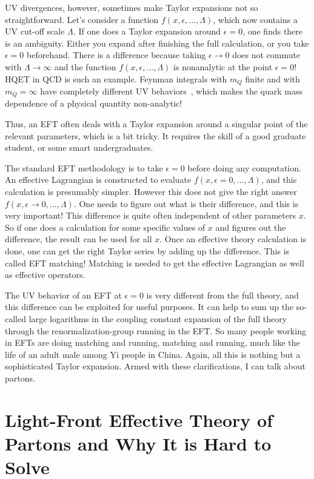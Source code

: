 \documentclass[prd,aps,twocolumn,preprintnumbers,showpacs,nofootinbib,superscriptaddress,notitlepage]{revtex4-1}
\begin{document}
UV divergences, however, sometimes make Taylor expansions
not so straightforward. Let's consider a function
$f(x,\epsilon,...,\Lambda)$, which now contains a UV
cut-off scale $\Lambda$. If one does
a Taylor expansion around $\epsilon=0$, one finds
there is an ambiguity. Either you expand after finishing
the full calculation, or you take $\epsilon=0$ beforehand.
There is a difference because taking $\epsilon \to 0$ does not commute
with $\Lambda\to \infty$ and the function  $f(x,\epsilon,...,\Lambda)$
is nonanalytic at the point $\epsilon=0$! HQET in QCD is such an example.
Feynman integrals with $m_Q$ finite and with
$m_Q=\infty$ have completely different
UV behaviors~\cite{Manohar:2000dt}, which makes the quark
mass dependence of a physical quantity non-analytic!

Thus, an EFT often deals with a Taylor expansion around
a singular point of the relevant parameters, which is a bit
tricky. It requires the skill of a good graduate
student, or some smart undergraduates.

The standard EFT methodology is to take $\epsilon=0$
before doing any computation. An effective Lagrangian
is constructed to evaluate $f(x,\epsilon=0,...,\Lambda)$, and this calculation
is presumably simpler. However
this does not give the right answer $f(x,\epsilon\to 0,...,\Lambda)$.
One needs to figure out what is their difference, and
this is very important! This difference is quite
often independent of other parameters $x$. So if one does
a calculation for some specific values of $x$
and figures out the difference, the result
can be used for all $x$. Once an effective
theory calculation is done, one can get
the right Taylor series by adding up the
difference. This is called EFT matching! Matching
is needed to get the effective Lagrangian as well
as effective operators.

The UV behavior of an EFT at $\epsilon=0$ is very
different from the full theory, and this difference can be
exploited for useful purposes. It can help to sum up the
so-called large logarithms in the coupling constant expansion
of the full theory through the
renormalization-group running in the EFT. So many people working
in EFTs are doing matching and running, matching and running,
much like the life of an adult male among Yi people in China.
Again, all this is nothing but a sophisticated Taylor expansion. Armed with these
clarifications, I can talk about partons.

\section{Light-Front Effective Theory of Partons and Why It is Hard to Solve}
\end{document}
